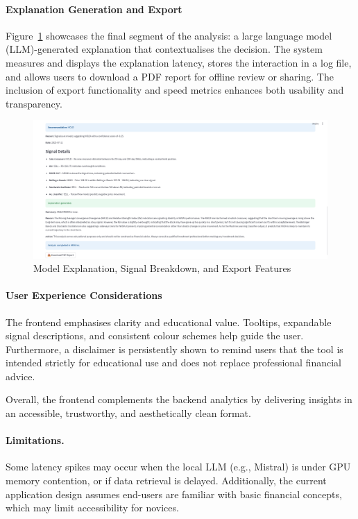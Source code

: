 \paragraph{Explanation Generation and Export}
Figure~\ref{fig:ui_explanation} showcases the final segment of the analysis: a large language model (LLM)-generated explanation that contextualises the decision. The system measures and displays the explanation latency, stores the interaction in a log file, and allows users to download a PDF report for offline review or sharing. The inclusion of export functionality and speed metrics enhances both usability and transparency.

\begin{figure}[h]
\centering
\includegraphics[width=0.9\linewidth]{assets/ui3-explanation.png}
\caption{Model Explanation, Signal Breakdown, and Export Features}
\label{fig:ui_explanation}
\end{figure}

\FloatBarrier

\paragraph{User Experience Considerations}
The frontend emphasises clarity and educational value. Tooltips, expandable signal descriptions, and consistent colour schemes help guide the user. Furthermore, a disclaimer is persistently shown to remind users that the tool is intended strictly for educational use and does not replace professional financial advice.

Overall, the frontend complements the backend analytics by delivering insights in an accessible, trustworthy, and aesthetically clean format.

\paragraph{Limitations.}  
Some latency spikes may occur when the local LLM (e.g., Mistral) is under GPU memory contention, or if data retrieval is delayed. Additionally, the current application design assumes end-users are familiar with basic financial concepts, which may limit accessibility for novices.

